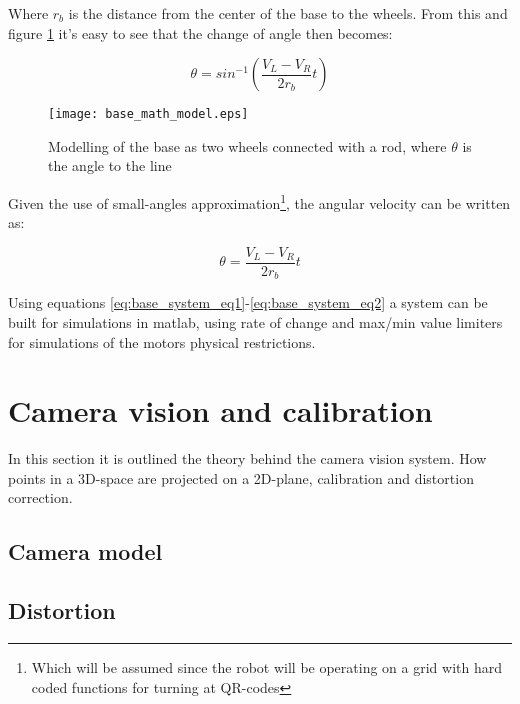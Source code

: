 \noindent Where $r_{b}$ is the distance from the center of the base to the wheels. From this and figure \ref{fig:base_math_model} it's easy to see that the change of angle then becomes:

\begin{equation}
    \theta = sin^{-1}\left(\frac{V_L-V_R}{2r_{b}}t\right)
\end{equation}

\begin{figure}[H]
    \centering
    \texttt{[image: base\_math\_model.eps]}
    \caption{Modelling of the base as two wheels connected with a rod, where $\theta$ is the angle to the line}
    \label{fig:base_math_model}
\end{figure}

Given the use of small-angles approximation\footnote{Which will be assumed since the robot will be operating on a grid with hard coded functions for turning at QR-codes}, the angular velocity can be written as:

\begin{equation}
    \theta = \frac{V_L-V_R}{2r_{b}}t
\end{equation}


\noindent Using equations \eqref{eq:base_system_eq1}-\eqref{eq:base_system_eq2} a system can be built for simulations in matlab, using rate of change and max/min value limiters for simulations of the motors physical restrictions.



\section*{Camera vision and calibration}
In this section it is outlined the theory behind the camera vision system. 
How points in a 3D-space are projected on a 2D-plane, calibration and distortion correction. 
\subsection*{Camera model}
\subsection*{Distortion}
